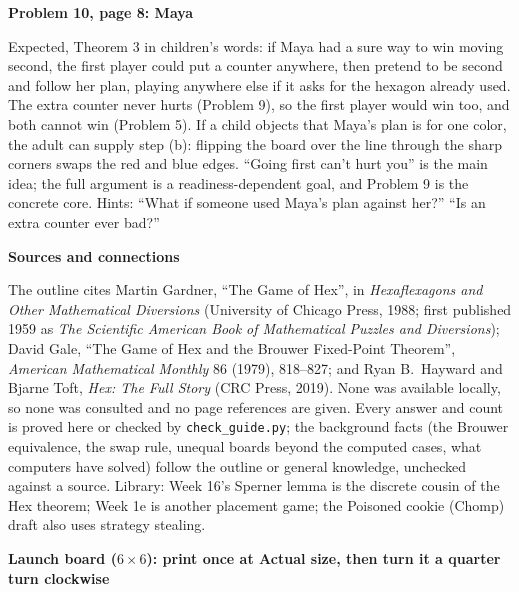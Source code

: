 \documentclass[11pt]{article}
\newcommand{\head}[1]{\par\textbf{\large #1}\par\nopagebreak}
\newcommand{\sub}[1]{\par\textbf{#1}\par\nopagebreak}
\newcommand{\x}{\ensuremath{\times}}
\begin{document}
\sub{Problem 10, page 8: Maya}
Expected, Theorem 3 in children's words: if Maya had a sure way to win moving second, the first player could put a counter anywhere, then pretend to be second and follow her plan, playing anywhere else if it asks for the hexagon already used. The extra counter never hurts (Problem 9), so the first player would win too, and both cannot win (Problem 5). If a child objects that Maya's plan is for one color, the adult can supply step (b): flipping the board over the line through the sharp corners swaps the red and blue edges. ``Going first can't hurt you'' is the main idea; the full argument is a readiness-dependent goal, and Problem 9 is the concrete core. Hints: ``What if someone used Maya's plan against her?'' ``Is an extra counter ever bad?''

\head{Sources and connections}
The outline cites Martin Gardner, ``The Game of Hex'', in \emph{Hexaflexagons and Other Mathematical Diversions} (University of Chicago Press, 1988; first published 1959 as \emph{The Scientific American Book of Mathematical Puzzles and Diversions}); David Gale, ``The Game of Hex and the Brouwer Fixed-Point Theorem'', \emph{American Mathematical Monthly} 86 (1979), 818--827; and Ryan B.\ Hayward and Bjarne Toft, \emph{Hex: The Full Story} (CRC Press, 2019). None was available locally, so none was consulted and no page references are given. Every answer and count is proved here or checked by \texttt{check\_guide.py}; the background facts (the Brouwer equivalence, the swap rule, unequal boards beyond the computed cases, what computers have solved) follow the outline or general knowledge, unchecked against a source. Library: Week 16's Sperner lemma is the discrete cousin of the Hex theorem; Week 1e is another placement game; the Poisoned cookie (Chomp) draft also uses strategy stealing.

\newpage
{}
\head{Launch board ($6\x6$): print once at Actual size, then turn it a quarter turn clockwise}\label{launchboard}
\begin{center}\end{center}
\end{document}
